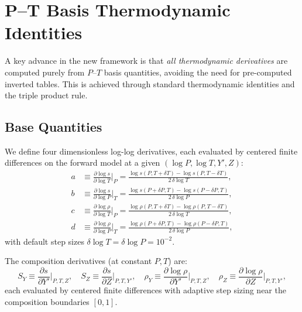 \documentclass[twocolumn]{aastex701}
\begin{document}
\section{P--T Basis Thermodynamic Identities}\label{sec:pt_derivs}

A key advance in the new framework is that \emph{all thermodynamic derivatives} are computed purely from $P$--$T$ basis quantities, avoiding the need for pre-computed inverted tables.
This is achieved through standard thermodynamic identities and the triple product rule.

\subsection{Base Quantities}\label{sec:base_derivs}

We define four dimensionless log-log derivatives, each evaluated by centered finite differences on the forward model at a given $(\log P, \log T, Y', Z)$:
\begin{align}
    a &\equiv \frac{\partial \log s}{\partial \log T}\bigg|_{P} = \frac{\log s(P, T{+}\delta T) - \log s(P, T{-}\delta T)}{2\,\delta\log T}, \label{eq:a} \\[4pt]
    b &\equiv \frac{\partial \log s}{\partial \log P}\bigg|_{T} = \frac{\log s(P{+}\delta P, T) - \log s(P{-}\delta P, T)}{2\,\delta\log P}, \label{eq:b} \\[4pt]
    c &\equiv \frac{\partial \log\rho}{\partial \log T}\bigg|_{P} = \frac{\log\rho(P, T{+}\delta T) - \log\rho(P, T{-}\delta T)}{2\,\delta\log T}, \label{eq:c} \\[4pt]
    d &\equiv \frac{\partial \log\rho}{\partial \log P}\bigg|_{T} = \frac{\log\rho(P{+}\delta P, T) - \log\rho(P{-}\delta P, T)}{2\,\delta\log P}, \label{eq:d}
\end{align}
with default step sizes $\delta\log T = \delta\log P = 10^{-2}$.

The composition derivatives (at constant $P, T$) are:
\begin{equation}
    S_Y \equiv \frac{\partial s}{\partial Y'}\bigg|_{P,T,Z}, \quad
    S_Z \equiv \frac{\partial s}{\partial Z}\bigg|_{P,T,Y'}, \quad
    \rho_Y \equiv \frac{\partial \log\rho}{\partial Y'}\bigg|_{P,T,Z}, \quad
    \rho_Z \equiv \frac{\partial \log\rho}{\partial Z}\bigg|_{P,T,Y'},
\end{equation}
each evaluated by centered finite differences with adaptive step sizing near the composition boundaries $[0, 1]$.
\end{document}
